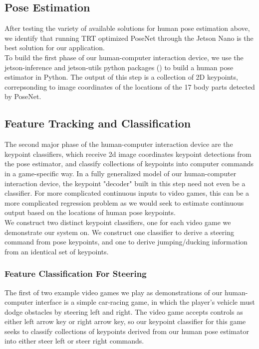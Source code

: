 \documentclass[10pt,twocolumn,letterpaper]{article}
\begin{document}
\subsection{Pose Estimation}
After testing the variety of available solutions for human pose estimation 
above, we identify that running TRT optimized PoseNet through the Jetson Nano 
is the best solution for our application.\\

To build the first phase of our human-computer interaction device, we use the 
jetson-inference and jetson-utils python packages (\cite{jetsonInference}) 
to build a human pose estimator in Python. The output of this step is a 
collection of 2D keypoints, correpsonding to image coordinates of the locations 
of the 17 body parts detected by PoseNet.

\subsection{Feature Tracking and Classification}
The second major phase of the human-computer interaction device are the 
keypoint classifiers, which receive 2d image coordinates keypoint detections 
from the pose estimator, and classify collections of keypoints into computer 
commands in a game-specific way. In a fully generalized model of our 
human-computer interaction device, the keypoint "decoder" built in this step 
need not even be a classifier. For more complicated continuous inputs to 
video games, this can be a more complicated regression problem as we would 
seek to estimate continuous output based on the locations of human pose 
keypoints.\\

We construct two distinct keypoint classifiers, one for each video game we 
demonstrate our system on. We construct one classifier to derive a steering 
command from pose keypoints, and one to derive jumping/ducking information 
from an identical set of keypoints.

\subsubsection{Feature Classification For Steering}
The first of two example video games we play as demonstrations of our 
human-computer interface is a simple car-racing game, in which the player's 
vehicle must dodge obstacles by steering left and right. The video game 
accepts controls as either left arrow key or right arrow key, so our 
keypoint classifier for this game seeks to classify collections of keypoints 
derived from our human pose estimator into either steer left or steer right 
commands.\\
\end{document}
